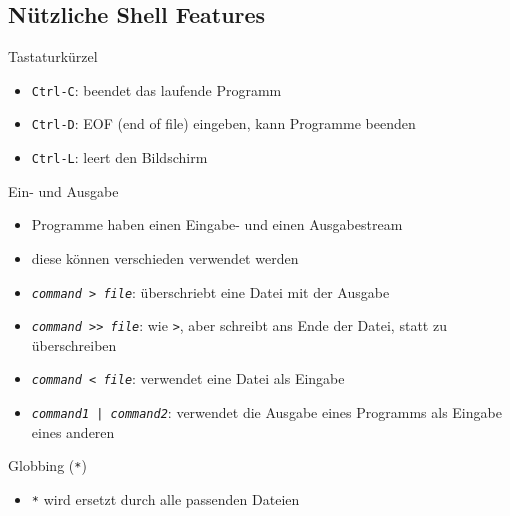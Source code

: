   \subsection{Nützliche Shell Features}
    \begin{frame}{Tastaturkürzel}
      \begin{itemize}
        \item \texttt{Ctrl-C}: beendet das laufende Programm
        \item \texttt{Ctrl-D}: EOF (end of file) eingeben, kann Programme beenden
        \item \texttt{Ctrl-L}: leert den Bildschirm
      \end{itemize}
    \end{frame}

    \begin{frame}{Ein- und Ausgabe}
      \begin{itemize}
        \item Programme haben einen Eingabe- und einen Ausgabestream
        \item diese können verschieden verwendet werden
        \item \texttt{\textit{command} > \textit{file}}: überschriebt eine Datei mit der Ausgabe
        \item \texttt{\textit{command} >> \textit{file}}: wie \texttt{>}, aber schreibt ans Ende der Datei, statt zu überschreiben
        \item \texttt{\textit{command} < \textit{file}}: verwendet eine Datei als Eingabe
        \item \texttt{\textit{command1} | \textit{command2}}: verwendet die Ausgabe eines Programms als Eingabe eines anderen
      \end{itemize}
    \end{frame}

    \begin{frame}{Globbing (\texttt{*})}
      \begin{itemize}
        \item \texttt{*} wird ersetzt durch alle passenden Dateien
      \end{itemize}
    \end{frame}
